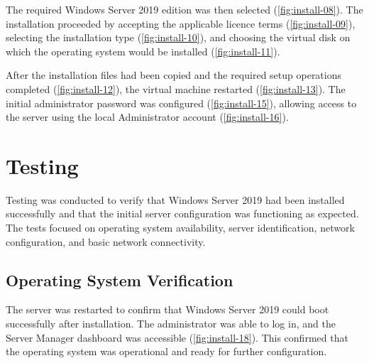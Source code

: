 The required Windows Server 2019 edition was then selected (\autoref{fig:install-08}). The installation proceeded by accepting the applicable licence terms (\autoref{fig:install-09}), selecting the installation type (\autoref{fig:install-10}), and choosing the virtual disk on which the operating system would be installed (\autoref{fig:install-11}).


After the installation files had been copied and the required setup operations completed (\autoref{fig:install-12}), the virtual machine restarted (\autoref{fig:install-13}). The initial administrator password was configured (\autoref{fig:install-15}), allowing access to the server using the local Administrator account (\autoref{fig:install-16}).


\section{Testing}
\label{sec:install-testing}
Testing was conducted to verify that Windows Server 2019 had been installed successfully and that the initial server configuration was functioning as expected. The tests focused on operating system availability, server identification, network configuration, and basic network connectivity.

\subsection{Operating System Verification}
\label{sec:install-osverify}
The server was restarted to confirm that Windows Server 2019 could boot successfully after installation. The administrator was able to log in, and the Server Manager dashboard was accessible (\autoref{fig:install-18}). This confirmed that the operating system was operational and ready for further configuration.

